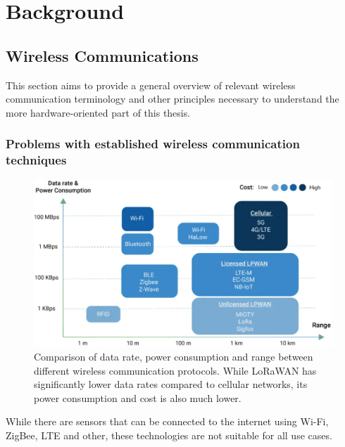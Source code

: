 \chapter{Background}

\section{Wireless Communications}

This section aims to provide a general overview of relevant wireless communication terminology and other principles necessary to understand the more hardware-oriented part of this thesis.

\subsection{Problems with established wireless communication techniques}

\begin{figure}[htbp]
    \centering
    \includegraphics[width=1\textwidth]{pictures/lora/comparison-wireless-protocols.png}
    \caption[Comparison of data rate, power consumption and range between different wireless communication protocols.]
        {
            Comparison of data rate, power consumption and range between different wireless communication protocols.
            While \ac{LoRaWAN} has significantly lower data rates compared to cellular networks, its power consumption and cost is also much lower.~\protect\cite{wang_comparison_2021}
        }\label{pic:wireless-protocols-comparison}
\end{figure}

While there are sensors that can be connected to the internet using Wi-Fi, ZigBee, \ac{LTE} and other, these technologies are not suitable for all use cases.

